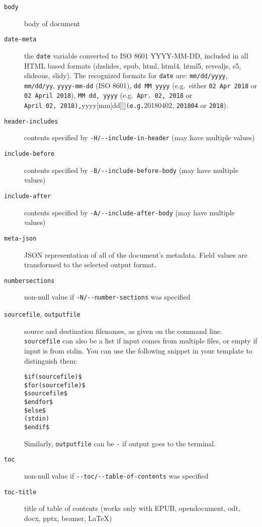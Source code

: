 \documentclass[
]{article}
\begin{document}
\begin{description}
\item[\texttt{body}]
body of document
\item[\texttt{date-meta}]
the \texttt{date} variable converted to ISO 8601 YYYY-MM-DD, included in
all HTML based formats (dzslides, epub, html, html4, html5, revealjs,
s5, slideous, slidy). The recognized formats for \texttt{date} are:
\texttt{mm/dd/yyyy}, \texttt{mm/dd/yy}, \texttt{yyyy-mm-dd} (ISO 8601),
\texttt{dd\ MM\ yyyy} (e.g.~either \texttt{02\ Apr\ 2018} or
\texttt{02\ April\ 2018}), \texttt{MM\ dd,\ yyyy}
(e.g.~\texttt{Apr.\ 02,\ 2018} or
\texttt{April\ 02,\ 2018),}yyyy{[}mm{[}dd{]}{]}{]}\texttt{(e.g.}20180402,
\texttt{201804} or \texttt{2018}).
\item[\texttt{header-includes}]
contents specified by \texttt{-H/-\/-include-in-header} (may have
multiple values)
\item[\texttt{include-before}]
contents specified by \texttt{-B/-\/-include-before-body} (may have
multiple values)
\item[\texttt{include-after}]
contents specified by \texttt{-A/-\/-include-after-body} (may have
multiple values)
\item[\texttt{meta-json}]
JSON representation of all of the document's metadata. Field values are
transformed to the selected output format.
\item[\texttt{numbersections}]
non-null value if \texttt{-N/-\/-number-sections} was specified
\item[\texttt{sourcefile}, \texttt{outputfile}]
source and destination filenames, as given on the command line.
\texttt{sourcefile} can also be a list if input comes from multiple
files, or empty if input is from stdin. You can use the following
snippet in your template to distinguish them:

\begin{verbatim}
$if(sourcefile)$
$for(sourcefile)$
$sourcefile$
$endfor$
$else$
(stdin)
$endif$
\end{verbatim}

Similarly, \texttt{outputfile} can be \texttt{-} if output goes to the
terminal.
\item[\texttt{toc}]
non-null value if \texttt{-\/-toc/-\/-table-of-contents} was specified
\item[\texttt{toc-title}]
title of table of contents (works only with EPUB, opendocument, odt,
docx, pptx, beamer, LaTeX)
\end{description}
\end{document}
